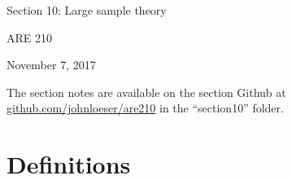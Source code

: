 \documentclass[12pt,english]{article}
\begin{document}
\begin{center}
{\Large{}Section 10: Large sample theory}
\par\end{center}{\Large \par}

\begin{center}
ARE 210
\par\end{center}

\begin{center}
November 7, 2017
\par\end{center}

The section notes are available on the section Github at \href{github.com/johnloeser/are210}{github.com/johnloeser/are210} in the ``section10'' folder.

\section{Definitions}
\end{document}
